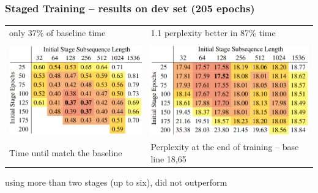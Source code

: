\documentclass{beamer}
\begin{document}
\begin{frame}
    \frametitle{Staged Training -- results on dev set (205 epochs)}
    \begin{center}
        \begin{tabular}{ l l }
        \small{only 37\% of baseline time}
        & \small{1.1 perplexity better in 87\% time} \\
        \\
        \includegraphics[scale=0.30]{img/shortformer_staged_train_time.png}
        & \includegraphics[scale=0.30]{img/shortformer_staged_train_perplexity.png} \\
        \scriptsize{Time until match the baseline} & \scriptsize{Perplexity at the end of training -- base line 18,65 }
        \end{tabular}
    \end{center}
    \begin{center}
        using more than two stages (up to six), did not outperform
    \end{center}
\end{frame}
\end{document}
